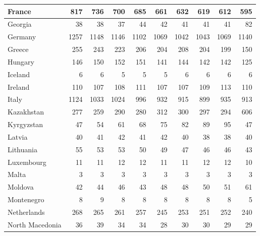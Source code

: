 \begin{table}
\begin{tabular}{|l|r|r|r|r|r|r|r|r|r|}
                        France&    817&    736&    700&    685&    661&    632&    619&    612&    595\\\hline
                       Georgia&     38&     38&     37&     44&     42&     41&     41&     41&     82\\\hline
                       Germany&   1257&   1148&   1146&   1102&   1069&   1042&   1043&   1069&   1140\\\hline
                        Greece&    255&    243&    223&    206&    204&    208&    204&    199&    150\\\hline
                       Hungary&    146&    150&    152&    151&    141&    144&    142&    142&    125\\\hline
                       Iceland&      6&      6&      5&      5&      5&      6&      6&      6&      6\\\hline
                       Ireland&    110&    107&    108&    111&    107&    107&    109&    113&    110\\\hline
                         Italy&   1124&   1033&   1024&    996&    932&    915&    899&    935&    913\\\hline
                    Kazakhstan&    277&    259&    290&    280&    312&    300&    297&    294&    606\\\hline
                    Kyrgyzstan&     47&     54&     61&     68&     75&     82&     89&     95&     47\\\hline
                        Latvia&     40&     41&     42&     41&     42&     40&     38&     38&     40\\\hline
                     Lithuania&     55&     53&     53&     50&     49&     47&     46&     46&     43\\\hline
                    Luxembourg&     11&     11&     12&     12&     11&     11&     12&     12&     10\\\hline
                         Malta&      3&      3&      3&      3&      3&      3&      3&      3&      3\\\hline
                       Moldova&     42&     44&     46&     43&     48&     48&     50&     51&     61\\\hline
                    Montenegro&      8&      9&      8&      8&      8&      8&      8&      8&      5\\\hline
                   Netherlands&    268&    265&    261&    257&    245&    253&    251&    252&    240\\\hline
               North Macedonia&     36&     39&     34&     34&     28&     30&     30&     29&     29\\\hline

\end{tabular}
\end{table}
